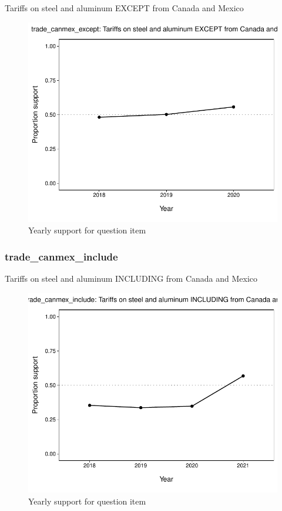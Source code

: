 \documentclass[
  12pt]{article}
\begin{document}
Tariffs on steel and aluminum EXCEPT from Canada and Mexico

\begin{figure}

{\centering \includegraphics{error-checking_files/figure-latex/unnamed-chunk-3-35} 

}

\caption{Yearly support for question item}\label{fig:unnamed-chunk-3-35}
\end{figure}

\hypertarget{trade_canmex_include}{%
\subsubsection{trade\_canmex\_include}\label{trade_canmex_include}}

Tariffs on steel and aluminum INCLUDING from Canada and Mexico

\begin{figure}

{\centering \includegraphics{error-checking_files/figure-latex/unnamed-chunk-3-36} 

}

\caption{Yearly support for question item}\label{fig:unnamed-chunk-3-36}
\end{figure}
\end{document}
